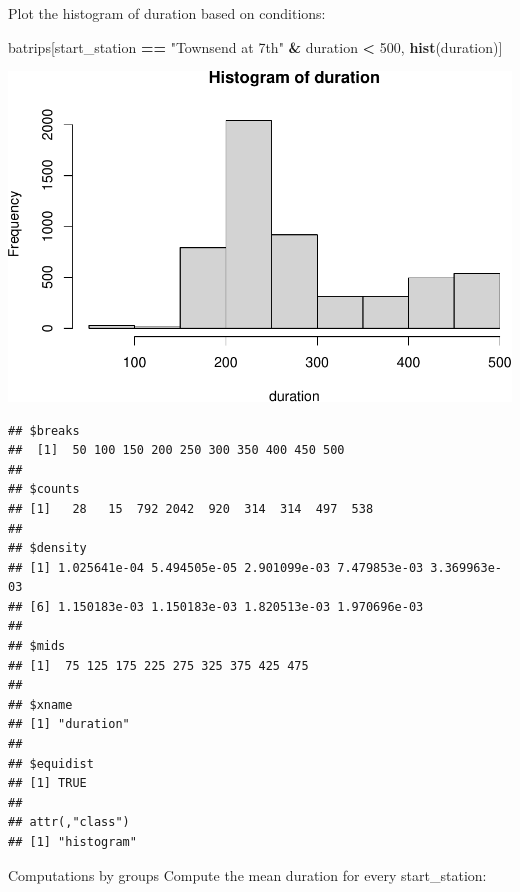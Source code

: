 \documentclass[]{book}
\newenvironment{Shaded}{\begin{snugshade}}{\end{snugshade}}
\newcommand{\DataTypeTok}[1]{\textcolor[rgb]{0.13,0.29,0.53}{#1}}
\newcommand{\DecValTok}[1]{\textcolor[rgb]{0.00,0.00,0.81}{#1}}
\newcommand{\KeywordTok}[1]{\textcolor[rgb]{0.13,0.29,0.53}{\textbf{#1}}}
\newcommand{\NormalTok}[1]{#1}
\newcommand{\OperatorTok}[1]{\textcolor[rgb]{0.81,0.36,0.00}{\textbf{#1}}}
\newcommand{\StringTok}[1]{\textcolor[rgb]{0.31,0.60,0.02}{#1}}
\begin{document}
Plot the histogram of duration based on conditions:

\begin{Shaded}
\begin{Highlighting}[]
\NormalTok{batrips[start_station }\OperatorTok{==}\StringTok{ "Townsend at 7th"} \OperatorTok{&}\StringTok{ }\NormalTok{duration }\OperatorTok{<}\StringTok{ }\DecValTok{500}\NormalTok{, }\KeywordTok{hist}\NormalTok{(duration)]}
\end{Highlighting}
\end{Shaded}

\includegraphics{code4stem_files/figure-latex/make histogram-1.pdf}

\begin{verbatim}
## $breaks
##  [1]  50 100 150 200 250 300 350 400 450 500
## 
## $counts
## [1]   28   15  792 2042  920  314  314  497  538
## 
## $density
## [1] 1.025641e-04 5.494505e-05 2.901099e-03 7.479853e-03 3.369963e-03
## [6] 1.150183e-03 1.150183e-03 1.820513e-03 1.970696e-03
## 
## $mids
## [1]  75 125 175 225 275 325 375 425 475
## 
## $xname
## [1] "duration"
## 
## $equidist
## [1] TRUE
## 
## attr(,"class")
## [1] "histogram"
\end{verbatim}

Computations by groups
Compute the mean duration for every start\_station:

\begin{Shaded}
\end{Shaded}
\end{document}
